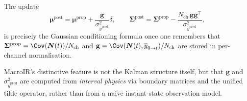 \documentclass[11pt]{article}
\begin{document}
The update
\[
  \boldsymbol{\mu}^{\text{post}}
  =
  \boldsymbol{\mu}^{\text{prop}}
  +
  \frac{\mathbf{g}}{\sigma^2_{\overline{y}^{\text{pred}}}}\delta,
  \qquad
  \boldsymbol{\Sigma}^{\text{post}}
  =
  \boldsymbol{\Sigma}^{\text{prop}}
  -
  \frac{N_{\text{ch}}\,\mathbf{g}\mathbf{g}^{\top}}
       {\sigma^2_{\overline{y}^{\text{pred}}}},
\]
is precisely the Gaussian conditioning formula once one remembers that
\(
\boldsymbol{\Sigma}^{\text{prop}}=\Cov(\boldsymbol{N}(t))/N_{\text{ch}}
\)
and
\(
\mathbf{g}=\Cov(\boldsymbol{N}(t),\overline{y}_{0\to t})/N_{\text{ch}}
\)
are stored in per-channel normalisation.

MacroIR's distinctive feature is not the Kalman structure itself, but that \(\mathbf{g}\) and \(\sigma^2_{\overline{y}^{\text{pred}}}\) are computed from \emph{interval physics} via boundary matrices and the unified tilde operator, rather than from a naive instant-state observation model.
\end{document}
